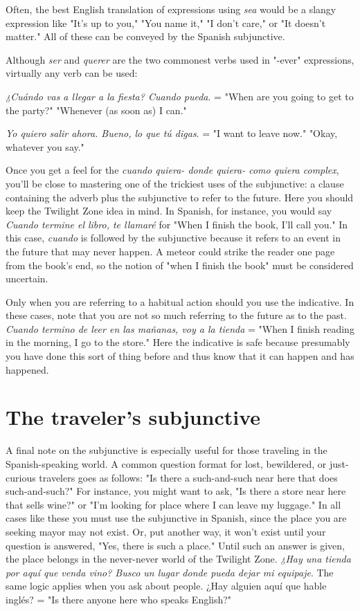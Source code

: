 \documentclass[14pt,a4paper,oneside]{memoir}
\newcommand{\bsk}{\vspace{20pt}}
\newcommand{\indu}{\hspace{20pt}}
\begin{document}
\bsk

Often, the best English translation of expressions using \emph{sea}
would be a slangy expression like "It's up to you," "You name it," "I
don't care," or "It doesn't matter." All of these can be conveyed by the
Spanish subjunctive.

Although \emph{ser} and \emph{querer} are the two commonest verbs used in
"-ever" expressions, virtually any verb can be used:

\bsk

\indu \emph{¿Cuándo vas a llegar a la fiesta? Cuando pueda}. = "When are
you going to get to the party?" "Whenever (as soon as)
I can."

\indu \emph{Yo quiero salir ahora. Bueno, lo que tú digas}. = "I want to
leave now." "Okay, whatever you say."

\bsk

Once you get a feel for the \emph{cuando quiera- donde quiera- como quiera complex}, you'll be close to mastering one of the trickiest uses of the subjunctive: a clause containing the adverb plus the
subjunctive to refer to the future. Here you should keep the Twilight
Zone idea in mind. In Spanish, for instance, you would say \emph{Cuando
termine el libro, te llamaré} for "When I finish the book, I'll call you."
In this case, \emph{cuando} is followed by the subjunctive because it refers to
an event in the future that may never happen. A meteor could strike
the reader one page from the book's end, so the notion of "when I finish the book" must be considered uncertain.

Only when you are referring to a habitual action should you
use the indicative. In these cases, note that you are not so much referring to the future as to the past. \emph{Cuando termino de leer en las mañanas, voy a la tienda} = "When I finish reading in the morning, I go
to the store." Here the indicative is safe because presumably you have
done this sort of thing before and thus know that it can happen and has
happened.

\section{The traveler's subjunctive}

A final note on the subjunctive is especially useful for those
traveling in the Spanish-speaking world. A common question format
for lost, bewildered, or just-curious travelers goes as follows: "Is there
a such-and-such near here that does such-and-such?" For instance, you
might want to ask, "Is there a store near here that sells wine?" or "I'm
looking for place where I can leave my luggage." In all cases like these
you must use the subjunctive in Spanish, since the place you are seeking mayor may not exist. Or, put another way, it won't exist until your
question is answered, "Yes, there is such a place." Until such an answer is given, the place belongs in the never-never world of the Twilight Zone.
\emph{¿Hay una tienda por aquí que venda vino? Busco un lugar
donde pueda dejar mi equipaje}. The same logic applies when you ask
about people. ¿Hay alguien aquí que hable inglés? = "Is there anyone
here who speaks English?"
\end{document}
